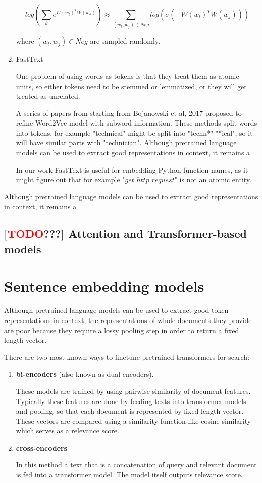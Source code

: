 \documentclass[longabstract,mgr,english]{iithesis}
\newcommand{\TODO}{\textcolor{red}{\huge{TODO}}}
\begin{document}
\begin{enumerate}
$$ log({\sum_k e^{W(w_t)^T W(w_k)}} ) \approx \sum_{(w_t, w_j) \in Neg} log(\sigma(-W(w_t)^T W(w_j)))$$

where \((w_t, w_j) \in Neg\) are sampled randomly. 

\item FastText

One problem of using words as tokens is that they treat them as atomic units, so either tokens need to be stemmed or lemmatized,
or they will get treated as unrelated.

A series of papers from starting from 
Bojanowski et al, 2017 \cite{fasttext} proposed to refine Word2Vec model with subword information.
These methods split words into tokens, for example "technical" might be split into "techn*" "*ical",
so it will have similar parts with "technician".
Although pretrained language models can be used to extract good representations in context, it remains a 

In our work FastText is useful for embedding Python function names,
as it might figure out that for example "\(get\_http\_request\)" is not an atomic entity.
\end{enumerate}
Although pretrained language models can be used to extract good representations in context, it remains a 

\subsection{[\TODO???] Attention and Transformer-based models}

\section{Sentence embedding models}

Although pretrained language models can be used to extract good token representations in context, the representations of whole documents they provide are poor because they require a lossy pooling step in order to return a fixed length vector.

There are two most known ways to finetune pretrained transformers for search\cite{sentence_transformers}: 

\begin{enumerate}
    \item \textbf{bi-encoders} (also known as dual encoders).
    
    These models are trained by using pairwise similarity of document features. Typically these features are done by feeding texts into transformer models and pooling, so that each document is represented by fixed-length vector. These vectors are compared using a similarity function like cosine similarity which serves as a relevance score.
    
    \item  \textbf{cross-encoders}
    
    In this method a text that is a concatenation of query and relevant document is fed into a transformer model. The model itself outputs relevance score.
\end{enumerate}
\end{document}

